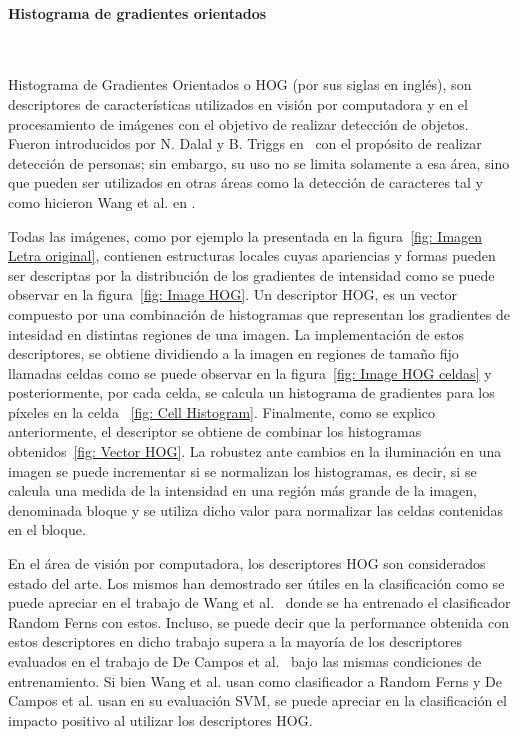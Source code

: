\paragraph{Histograma de gradientes orientados} ~\\
\label{subsection:hog}

	Histograma de Gradientes Orientados o HOG (por sus siglas en inglés), son descriptores de características utilizados en visión por computadora y en el procesamiento de imágenes con el objetivo de realizar detección de objetos. Fueron introducidos por N. Dalal y B. Triggs en~\cite{DT05} con el propósito de realizar detección de personas; sin embargo, su uso no se limita solamente a esa área, sino que pueden ser utilizados en otras áreas como la detección de caracteres tal y como hicieron Wang et al. en \cite{wang}.
	
	Todas las imágenes, como por ejemplo la presentada en la figura~\ref{fig: Imagen Letra original}, contienen estructuras locales cuyas apariencias y formas pueden ser descriptas por la distribución de los gradientes de intensidad como se puede observar en la figura~\ref{fig: Image HOG}.	Un descriptor HOG, es un vector compuesto por una combinación de histogramas que representan los gradientes de intesidad en distintas regiones de una imagen. La implementación de estos descriptores, se obtiene dividiendo a la imagen en regiones de tamaño fijo llamadas celdas como se puede observar en la figura~\ref{fig: Image HOG celdas} y posteriormente, por cada celda, se calcula un histograma de gradientes para los píxeles en la celda ~\ref{fig: Cell Histogram}. Finalmente, como se explico anteriormente, el descriptor se obtiene de combinar los histogramas obtenidos~\ref{fig: Vector HOG}. La robustez ante cambios en la iluminación en una imagen se puede incrementar si se normalizan los histogramas, es decir, si se calcula una medida de la intensidad en una región más grande de la imagen, denominada bloque y se utiliza dicho valor para normalizar las celdas contenidas en el bloque.
	
	
	En el área de visión por computadora, los descriptores HOG son considerados estado del arte. Los mismos han demostrado ser útiles en la clasificación como se puede apreciar en el trabajo de Wang et al.~\cite{wang} donde se ha entrenado el clasificador Random Ferns con estos. Incluso, se puede decir que la performance obtenida con estos descriptores en dicho trabajo supera a la mayoría de los descriptores evaluados en el trabajo de De Campos et al.~\cite{dCBV09} bajo las mismas condiciones de entrenamiento. Si bien Wang et al. usan como clasificador a Random Ferns y De Campos et al. usan en su evaluación SVM, se puede apreciar en la clasificación el impacto positivo al utilizar los descriptores HOG.
	
